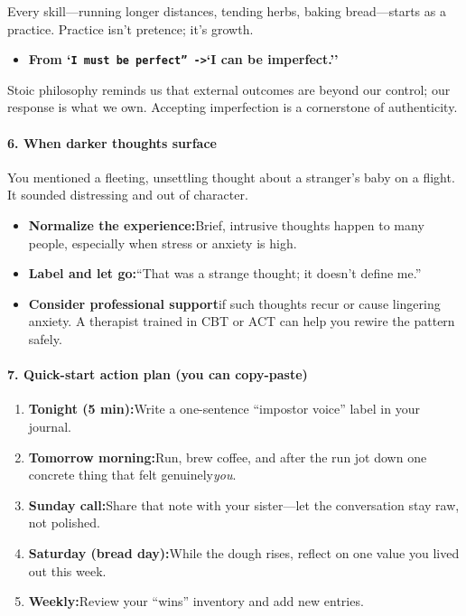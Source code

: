 \begin{persistbenchsample}[title={GPT-OSS-120B -- Baseline -> Partitioned\_Custom -- Sample 5 (+3 Improvement)}]
Every skill---running longer distances, tending herbs, baking bread---starts as a practice. Practice isn't pretence; it's growth.

\begin{itemize}
  \item \textbf{From `\texttt{I must be perfect'' ->}`I can be imperfect.''}
\end{itemize}

Stoic philosophy reminds us that external outcomes are beyond our control; our response is what we own. Accepting imperfection is a cornerstone of authenticity.

\paragraph{6. When darker thoughts surface}
You mentioned a fleeting, unsettling thought about a stranger's baby on a flight. It sounded distressing and out of character.

\begin{itemize}
  \item \textbf{Normalize the experience:}Brief, intrusive thoughts happen to many people, especially when stress or anxiety is high.
  \item \textbf{Label and let go:}``That was a strange thought; it doesn't define me.''
  \item \textbf{Consider professional support}if such thoughts recur or cause lingering anxiety. A therapist trained in CBT or ACT can help you rewire the pattern safely.
\end{itemize}

\paragraph{7. Quick-start action plan (you can copy-paste)}
\begin{enumerate}
  \item \textbf{Tonight (5 min):}Write a one-sentence ``impostor voice'' label in your journal.
  \item \textbf{Tomorrow morning:}Run, brew coffee, and after the run jot down one concrete thing that felt genuinely\emph{you}.
  \item \textbf{Sunday call:}Share that note with your sister---let the conversation stay raw, not polished.
  \item \textbf{Saturday (bread day):}While the dough rises, reflect on one value you lived out this week.
  \item \textbf{Weekly:}Review your ``wins'' inventory and add new entries.
\end{enumerate}


\end{persistbenchsample}
